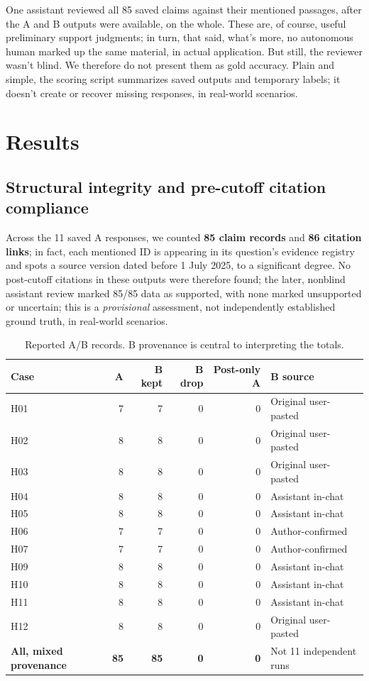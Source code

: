 \documentclass[12pt,a4paper]{article}
\begin{document}
One assistant reviewed all 85 saved claims against their mentioned passages, after the A and B outputs were available, on the whole. These are, of course, useful preliminary support judgments; in turn, that said, what's more, no autonomous human marked up the same material, in actual application. But still, the reviewer wasn't blind. We therefore do not present them as gold accuracy. Plain and simple, the scoring script summarizes saved outputs and temporary labels; it doesn't create or recover missing responses, in real-world scenarios.

\section{Results}
\subsection{Structural integrity and pre-cutoff citation compliance}
Across the 11 saved A responses, we counted \textbf{85 claim records} and \textbf{86 citation links}; in fact, each mentioned ID is appearing in its question's evidence registry and spots a source version dated before 1 July 2025, to a significant degree. No post-cutoff citations in these outputs were therefore found; the later, nonblind assistant review marked 85/85 data as supported, with none marked unsupported or uncertain; this is a \emph{provisional} assessment, not independently established ground truth, in real-world scenarios.

\begin{table}[ht]
\centering\small
\caption{Reported A/B records. B provenance is central to interpreting the totals.}
\label{tab:cases}
\begin{tabular}{lrrrrl}
\toprule
Case & A & B kept & B drop & Post-only A & B source\\
\midrule
H01 & 7 & 7 & 0 & 0 & Original user-pasted\\
H02 & 8 & 8 & 0 & 0 & Original user-pasted\\
H03 & 8 & 8 & 0 & 0 & Original user-pasted\\
H04 & 8 & 8 & 0 & 0 & Assistant in-chat\\
H05 & 8 & 8 & 0 & 0 & Assistant in-chat\\
H06 & 7 & 7 & 0 & 0 & Author-confirmed\\
H07 & 7 & 7 & 0 & 0 & Author-confirmed\\
H09 & 8 & 8 & 0 & 0 & Assistant in-chat\\
H10 & 8 & 8 & 0 & 0 & Assistant in-chat\\
H11 & 8 & 8 & 0 & 0 & Assistant in-chat\\
H12 & 8 & 8 & 0 & 0 & Original user-pasted\\
\midrule
\textbf{All, mixed provenance} & \textbf{85} & \textbf{85} & \textbf{0} & \textbf{0} & Not 11 independent runs\\
\bottomrule
\end{tabular}
\end{table}
\end{document}
